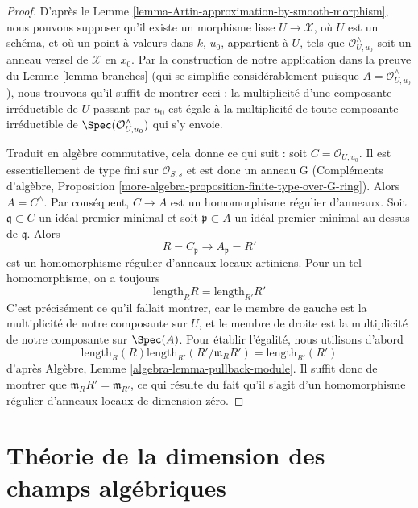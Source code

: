 \begin{proof}
D'après le Lemme \ref{lemma-Artin-approximation-by-smooth-morphism}, nous
pouvons supposer qu'il existe un morphisme lisse $U \to \mathcal{X}$,
où $U$ est un schéma, et où un point à valeurs dans $k$, $u_0$, appartient à $U$,
tels que $\mathcal{O}_{U, u_0}^\wedge$ soit un anneau versel de
$\mathcal{X}$ en $x_0$. Par la construction de notre application dans
la preuve du Lemme \ref{lemma-branches} (qui se simplifie
considérablement puisque $A = \mathcal{O}_{U, u_0}^\wedge$), nous trouvons
qu'il suffit de montrer ceci : la multiplicité d'une composante irréductible
de $U$ passant par $u_0$ est égale à la
multiplicité de toute composante irréductible de
$\Spec(\mathcal{O}_{U, u_0}^\wedge)$ qui s'y envoie.

\medskip\noindent
Traduit en algèbre commutative, cela donne ce qui suit :
soit $C = \mathcal{O}_{U, u_0}$. Il est essentiellement de type fini
sur $\mathcal{O}_{S, s}$ et est donc un anneau G (Compléments d'algèbre,
Proposition \ref{more-algebra-proposition-finite-type-over-G-ring}).
Alors $A = C^\wedge$. Par conséquent, $C \to A$ est un homomorphisme régulier d'anneaux.
Soit $\mathfrak q \subset C$ un idéal premier minimal et soit $\mathfrak p \subset A$
un idéal premier minimal au-dessus de $\mathfrak q$. Alors
$$
R = C_\mathfrak p \longrightarrow A_\mathfrak p = R'
$$
est un homomorphisme régulier d'anneaux locaux artiniens. Pour un tel homomorphisme,
on a toujours
$$
\text{length}_R R = \text{length}_{R'} R'
$$
C'est précisément ce qu'il fallait montrer, car le membre de gauche
est la multiplicité de notre composante sur $U$, et le membre de droite
est la multiplicité de notre composante sur $\Spec(A)$.
Pour établir l'égalité, nous utilisons d'abord
$$
\text{length}_R(R) \text{length}_{R'}(R'/\mathfrak m_R R') =
\text{length}_{R'}(R')
$$
d'après Algèbre, Lemme \ref{algebra-lemma-pullback-module}. Il suffit donc
de montrer que $\mathfrak m_R R' = \mathfrak m_{R'}$, ce qui résulte
du fait qu'il s'agit d'un homomorphisme régulier d'anneaux locaux de dimension zéro.
\end{proof}













\section{Théorie de la dimension des champs algébriques}
\label{section-dimension-of-algebraic-stacks}

